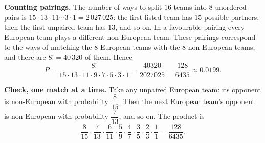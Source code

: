 \textbf{Counting pairings.} The number of ways to split $16$ teams into $8$ unordered pairs is $15\cdot13\cdot11\cdots3\cdot1=2\,027\,025$: the first listed team has $15$ possible partners, then the first unpaired team has $13$, and so on. In a favourable pairing every European team plays a different non-European team. These pairings correspond to the ways of matching the $8$ European teams with the $8$ non-European teams, and there are $8!=40\,320$ of them. Hence
\[
P=\dfrac{8!}{15\cdot13\cdot11\cdot9\cdot7\cdot5\cdot3\cdot1}=\dfrac{40320}{2027025}=\boxed{\dfrac{128}{6435}}\approx0.0199 .
\]

\textbf{Check, one match at a time.} Take any unpaired European team: its opponent is non-European with probability $\dfrac{8}{15}$. Then the next European team's opponent is non-European with probability $\dfrac{7}{13}$, and so on. The product is
\[
\dfrac{8}{15}\cdot\dfrac{7}{13}\cdot\dfrac{6}{11}\cdot\dfrac{5}{9}\cdot\dfrac{4}{7}\cdot\dfrac{3}{5}\cdot\dfrac{2}{3}\cdot\dfrac{1}{1}=\dfrac{128}{6435}.
\]
